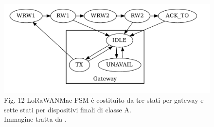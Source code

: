 \documentclass[a4paper]{report} %
\begin{document}
\begin{figure}
\centering
\includegraphics[scale=.3]{Immagini/MSFLoRaMAC.png}
\label{fsm2}
Fig. 12 LoRaWANMac FSM è costituito da tre stati per gateway e sette stati per dispositivi finali di classe A.\\
Immagine tratta da \cite{art:rif.49}. \\
\end{figure}
\end{document}
